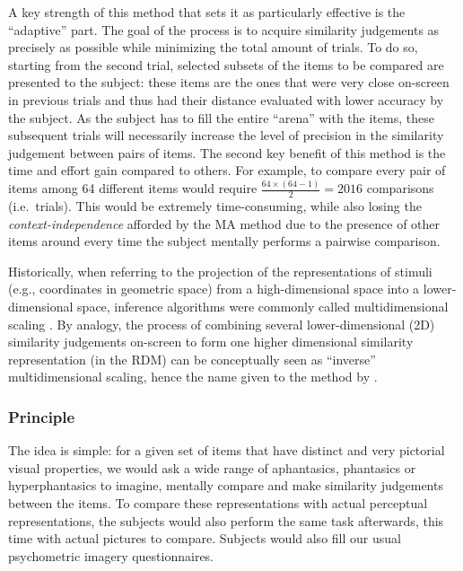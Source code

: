 \documentclass[
  authoryear]{elsarticle}
\begin{document}
\begin{figure}
\end{figure}%

A key strength of this method that sets it as particularly effective is
the ``adaptive'' part. The goal of the process is to acquire similarity
judgements as precisely as possible while minimizing the total amount of
trials. To do so, starting from the second trial, selected subsets of
the items to be compared are presented to the subject: these items are
the ones that were very close on-screen in previous trials and thus had
their distance evaluated with lower accuracy by the subject. As the
subject has to fill the entire ``arena'' with the items, these
subsequent trials will necessarily increase the level of precision in
the similarity judgement between pairs of items. The second key benefit
of this method is the time and effort gain compared to others. For
example, to compare every pair of items among 64 different items would
require \(\frac{64 \times (64-1)}{2} = 2016\) comparisons (i.e.~trials).
This would be extremely time-consuming, while also losing the
\emph{context-independence} afforded by the MA method due to the
presence of other items around every time the subject mentally performs
a pairwise comparison.

Historically, when referring to the projection of the representations of
stimuli (e.g., coordinates in geometric space) from a high-dimensional
space into a lower-dimensional space, inference algorithms were commonly
called multidimensional scaling \citep{roads2024}. By analogy, the
process of combining several lower-dimensional (2D) similarity
judgements on-screen to form one higher dimensional similarity
representation (in the RDM) can be conceptually seen as ``inverse''
multidimensional scaling, hence the name given to the method by
\citet{kriegeskorteInverseMDSInferring2012}.

\subsubsection{Principle}\label{principle}

The idea is simple: for a given set of items that have distinct and very
pictorial visual properties, we would ask a wide range of aphantasics,
phantasics or hyperphantasics to imagine, mentally compare and make
similarity judgements between the items. To compare these
representations with actual perceptual representations, the subjects
would also perform the same task afterwards, this time with actual
pictures to compare. Subjects would also fill our usual psychometric
imagery questionnaires.
\end{document}
